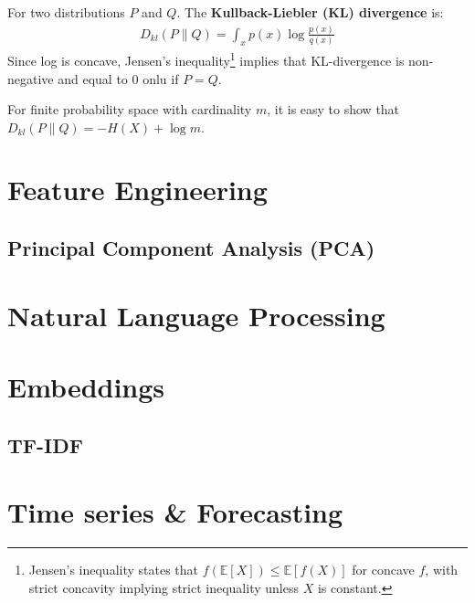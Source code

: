 \documentclass[12pt]{article}
\newcommand{\EE}{\ensuremath{\mathbb{E}}}
\begin{document}
For two distributions $P$ and $Q$. The
{\bf Kullback-Liebler (KL) divergence} is:
\begin{align*}
  D_{kl}(P\| Q) = \int_x p(x) \log \frac{p(x)}{q(x)}
\end{align*}
Since log is concave, Jensen's inequality\footnote{Jensen's inequality states
  that $f(\EE[X]) \leq \EE[f(X)]$
  for concave $f$, with strict concavity implying strict inequality unless $X$
  is constant.} implies that KL-divergence is non-negative and equal to 0 onlu
if $P=Q$.

For finite probability space with cardinality $m$, it is easy to show that $D_{kl}(P\|Q) = -H(X) + \log m$.

\pagebreak


\section{Feature Engineering}
\newrefsection

\subsection{Principal Component Analysis (PCA)}



\pagebreak



\section{Natural Language Processing}
\newrefsection

\section{Embeddings}

\subsection{TF-IDF} %


\pagebreak


\section{Time series \& Forecasting}
\newrefsection
\end{document}
